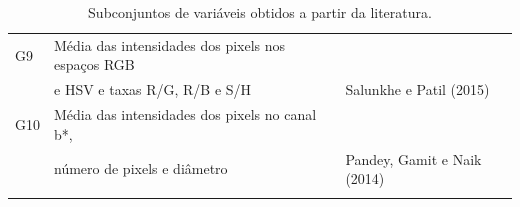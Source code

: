 \begin{longtable}{m{1cm} m{10cm} m{3.5cm}}
G9  & Média das intensidades dos pixels nos espaços RGB \\ & e HSV e taxas R/G, R/B e S/H                                                              & Salunkhe e Patil (2015)             \\ \hline
G10 & Média das intensidades dos pixels no canal b*, \\ & número de pixels e diâmetro                                                                   & Pandey, Gamit e Naik (2014) \\ \hline       
\caption{Subconjuntos de variáveis obtidos a partir da literatura.}\label{tbl:var_gps}
\end{longtable} 






